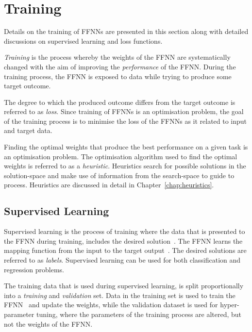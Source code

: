 \section{Training}
\label{sec:anns:training}

Details on the training of \acp{FFNN} are presented in this section along with
detailed discussions on supervised learning and loss functions.

\textit{Training} is the process whereby the weights of the \acs{FFNN} are systematically changed with the aim of improving the \textit{performance} of the \acs{FFNN}. During the training process, the \acs{FFNN} is exposed to data while trying to produce some target outcome.

The degree to which the produced outcome differs from the target outcome is referred to as \textit{loss}. Since training of \acp{FFNN} is an optimisation problem, the goal of the training process is to minimise the loss of the \acp{FFNN} as it related to input and target data.

Finding the optimal weights that produce the best performance on a given task is an optimisation problem. The optimisation algorithm used to find the optimal weights is referred to as a \textit{heuristic}. Heuristics search for possible solutions in the solution-space and make use of information from the search-space to guide to process. Heuristics are discussed in detail in Chapter~\ref{chap:heuristics}.


\subsection{Supervised Learning}
\label{sec:anns:training:supervised_learning}

Supervised learning is the process of training where the data that is presented to the \acs{FFNN} during training, includes the desired solution~\cite{ref:geron:2017}.  The \acs{FFNN} learns the mapping function from the input to the target output~\cite{ref:brownlee:2016}. The desired solutions are referred to as \textit{labels}. Supervised learning can be used for both classification and regression problems.

The training data that is used during supervised learning, is split proportionally into a \textit{training} and \textit{validation} set. Data in the training set is used to train the \acs{FFNN}~\cite{ref:james:2013} and update the weights, while the validation dataset is used for hyper-parameter tuning, where the parameters of the training process are altered, but not the weights of the \acs{FFNN}.

